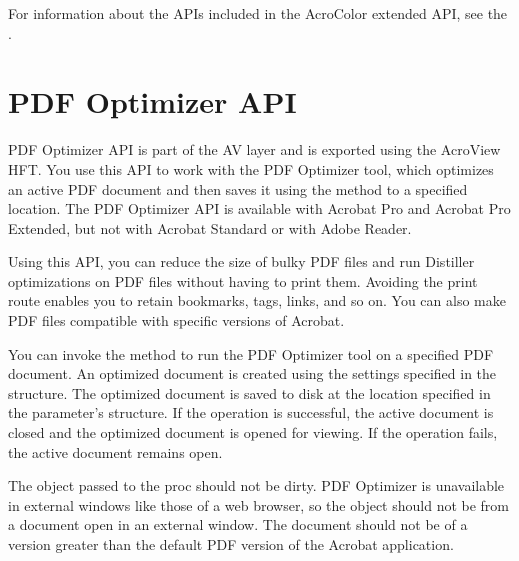 \documentclass[letterpaper,12pt,english,openany,oneside]{sphinxmanual}
\begin{document}
\begin{sphinxVerbatim}[commandchars=\\\{\}]
         
     

      
\end{sphinxVerbatim}

For information about the APIs included in the AcroColor extended API, see the .


\section{PDF Optimizer API}
\label{\detokenize{Plugins_ExtendedAPI:pdf-optimizer-api}}
PDF Optimizer API is part of the AV layer and is exported using the AcroView HFT. You use this API to work with the PDF Optimizer tool, which optimizes an active PDF document and then saves it using the  method to a specified location. The PDF Optimizer API is available with Acrobat Pro and Acrobat Pro Extended, but not with Acrobat Standard or with Adobe Reader.

Using this API, you can reduce the size of bulky PDF files and run Distiller optimizations on PDF files without having to print them. Avoiding the print route enables you to retain bookmarks, tags, links, and so on. You can also make PDF files compatible with specific versions of Acrobat.

You can invoke the  method to run the PDF Optimizer tool on a specified PDF document. An optimized document is created using the settings specified in the  structure. The optimized document is saved to disk at the location specified in the parameter’s structure. If the operation is successful, the active document is closed and the optimized document is opened for viewing. If the operation fails, the active document remains open.

The  object passed to the proc should not be dirty. PDF Optimizer is unavailable in external windows like those of a web browser, so the  object should not be from a document open in an external window. The document should not be of a version greater than the default PDF version of the Acrobat application.
\end{document}
